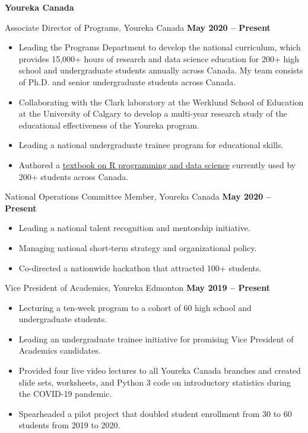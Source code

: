 \documentclass{article}
\begin{document}
\textbf{Youreka Canada}

Associate Director of Programs, Youreka Canada \hfill \textbf{May 2020 -- Present}
\begin{itemize}
    \item Leading the Programs Department to develop the national curriculum, which provides 15,000+ hours of research and data science education for 200+ high school and undergraduate students annually across Canada. My team consists of Ph.D. and senior undergraduate students across Canada.
    \item Collaborating with the Clark laboratory at the Werklund School of Education at the University of Calgary to develop a multi-year research study of the educational effectiveness of the Youreka program.
    \item Leading a national undergraduate trainee program for educational skills.
    \item Authored a \href{https://youreka-textbook.netlify.app/}{textbook on R programming and data science} currently used by 200+ students across Canada.
\end{itemize}

National Operations Committee Member, Youreka Canada \hfill \textbf{May 2020 -- Present}
\begin{itemize}
    \item Leading a national talent recognition and mentorship initiative.
    \item Managing national short-term strategy and organizational policy.
    \item Co-directed a nationwide hackathon that attracted 100+ students.
\end{itemize}

Vice President of Academics, Youreka Edmonton \hfill \textbf{May 2019 -- Present}
\begin{itemize}
    \item Lecturing a ten-week program to a cohort of 60 high school and undergraduate students.
    \item Leading an undergraduate trainee initiative for promising Vice President of Academics candidates.
    \item Provided four live video lectures to all Youreka Canada branches and created slide sets, worksheets, and Python 3 code on introductory statistics during the COVID-19 pandemic.
    \item Spearheaded a pilot project that doubled student enrollment from 30 to 60 students from 2019 to 2020.
\end{itemize}
\end{document}

